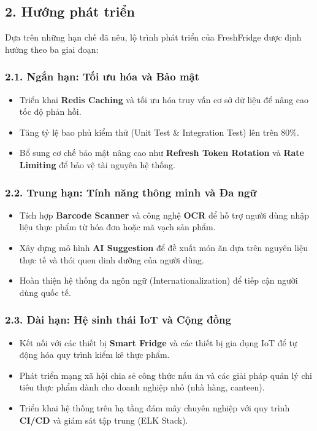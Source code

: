 \subsection*{2. Hướng phát triển}

Dựa trên những hạn chế đã nêu, lộ trình phát triển của FreshFridge được định hướng theo ba giai đoạn:

\subsubsection*{2.1. Ngắn hạn: Tối ưu hóa và Bảo mật}
\begin{itemize}
    \item Triển khai \textbf{Redis Caching} và tối ưu hóa truy vấn cơ sở dữ liệu để nâng cao tốc độ phản hồi.
    \item Tăng tỷ lệ bao phủ kiểm thử (Unit Test \& Integration Test) lên trên 80\%.
    \item Bổ sung cơ chế bảo mật nâng cao như \textbf{Refresh Token Rotation} và \textbf{Rate Limiting} để bảo vệ tài nguyên hệ thống.
\end{itemize}

\subsubsection*{2.2. Trung hạn: Tính năng thông minh và Đa ngữ}
\begin{itemize}
    \item Tích hợp \textbf{Barcode Scanner} và công nghệ \textbf{OCR} để hỗ trợ người dùng nhập liệu thực phẩm từ hóa đơn hoặc mã vạch sản phẩm.
    \item Xây dựng mô hình \textbf{AI Suggestion} để đề xuất món ăn dựa trên nguyên liệu thực tế và thói quen dinh dưỡng của người dùng.
    \item Hoàn thiện hệ thống đa ngôn ngữ (Internationalization) để tiếp cận người dùng quốc tế.
\end{itemize}

\subsubsection*{2.3. Dài hạn: Hệ sinh thái IoT và Cộng đồng}
\begin{itemize}
    \item Kết nối với các thiết bị \textbf{Smart Fridge} và các thiết bị gia dụng IoT để tự động hóa quy trình kiểm kê thực phẩm.
    \item Phát triển mạng xã hội chia sẻ công thức nấu ăn và các giải pháp quản lý chi tiêu thực phẩm dành cho doanh nghiệp nhỏ (nhà hàng, canteen).
    \item Triển khai hệ thống trên hạ tầng đám mây chuyên nghiệp với quy trình \textbf{CI/CD} và giám sát tập trung (ELK Stack).
\end{itemize}

